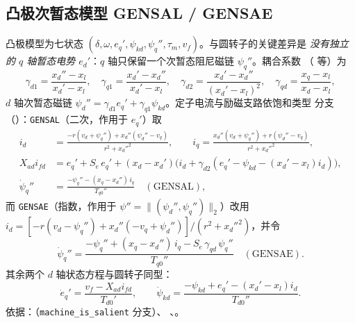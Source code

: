 \subsection{凸极次暂态模型 GENSAL / GENSAE}
\label{sec:dynamics-machine-gensal}
凸极模型为七状态 $(\delta,\omega,e_q',\psi_{kd},\psi_{q}'',\tau_m,v_f)$。与圆转子的关键差异是
\emph{没有独立的 $q$ 轴暂态电势 $e_d'$}：$q$ 轴只保留一个次暂态阻尼磁链 $\psi_q''$。耦合系数
（ 等）为
\begin{equation}
 \gamma_{d1}=\frac{x_d''-x_l}{x_d'-x_l},\quad
 \gamma_{q1}=\frac{x_d'-x_d''}{x_d'-x_l},\quad
 \gamma_{d2}=\frac{x_d'-x_d''}{(x_d'-x_l)^2},\quad
 \gamma_{qd}=\frac{x_q-x_l}{x_d-x_l},
\end{equation}
$d$ 轴次暂态磁链 $\psi_d''=\gamma_{d1}e_q'+\gamma_{q1}\psi_{kd}$。定子电流与励磁支路依饱和类型
分支（）：\texttt{GENSAL}（二次，作用于 $e_q'$）取
\begin{align}
 i_d &= \frac{-r(v_d+\psi_q'')+x_d''(\psi_d''-v_q)}{r^2+x_d''^2},\qquad
 i_q = \frac{x_d''(v_d+\psi_q'')+r(\psi_d''-v_q)}{r^2+x_d''^2},\\
 X_{ad}i_{fd} &= e_q'+S_e\,e_q'
   +(x_d-x_d')\big(i_d+\gamma_{d2}(e_q'-\psi_{kd}-(x_d'-x_l)i_d)\big),\\
 \dot\psi_q'' &= \frac{-\psi_q''-(x_q-x_d'')\,i_q}{T_{q0}''}\quad(\text{GENSAL}),
\end{align}
而 \texttt{GENSAE}（指数，作用于 $\psi''=\lVert(\psi_d'',\psi_q'')\rVert_2$）改用
$i_d=[-r(v_d-\psi_q'')+x_d''(-v_q+\psi_d'')]/(r^2+x_d''^2)$，并令
\begin{equation}
 \dot\psi_q''=\frac{-\psi_q''+(x_q-x_d'')\,i_q-S_e\,\gamma_{qd}\,\psi_q''}{T_{q0}''}
 \quad(\text{GENSAE}).
\end{equation}
其余两个 $d$ 轴状态方程与圆转子同型：
\begin{equation}
 \dot e_q'=\frac{v_f-X_{ad}i_{fd}}{T_{d0}'},\qquad
 \dot\psi_{kd}=\frac{-\psi_{kd}+e_q'-(x_d'-x_l)i_d}{T_{d0}''}.
\end{equation}
依据：（\texttt{machine\_is\_salient} 分支）、
、。

